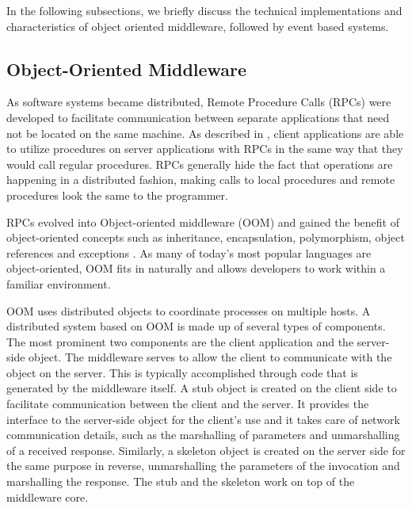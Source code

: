 \documentclass{acm_proc_article-sp}
\begin{document}
In the following subsections, we briefly discuss the technical implementations and characteristics of  object oriented middleware, followed by event based systems. 





\subsection{Object-Oriented Middleware}
\label{sec:techobj}


As software systems became distributed, Remote Procedure Calls (RPCs) were developed to facilitate communication between separate applications that need not be located on the same machine.  As described in \cite{Vinoski:2004p8371}, client applications are able to utilize procedures on server applications with RPCs in the same way that they would call regular procedures.  RPCs generally hide the fact that operations are happening in a distributed fashion, making calls to local procedures and remote procedures look the same to the programmer.

RPCs evolved into Object-oriented middleware (OOM) and gained the benefit of object-oriented concepts such as inheritance, encapsulation, polymorphism, object references and exceptions \cite{Pinus:2006p8367,Vinoski:2004p8371}.  As many of today's most popular languages are object-oriented, OOM fits in naturally and allows developers to work within a familiar environment.

OOM uses distributed objects to coordinate processes on multiple hosts.  A distributed system based on OOM is made up of several types of components.  The most prominent two components are the client application and the server-side object.  The middleware serves to allow the client to communicate with the object on the server.  This is typically accomplished through code that is generated by the middleware itself.  A stub object is created on the client side to facilitate communication between the client and the server.  It provides the interface to the server-side object for the client's use and it takes care of network communication details, such as the marshalling of parameters and unmarshalling of a received response.  Similarly, a skeleton object is created on the server side for the same purpose in reverse, unmarshalling the parameters of the invocation and marshalling the response.  The stub and the skeleton work on top of the middleware core.
\end{document}
